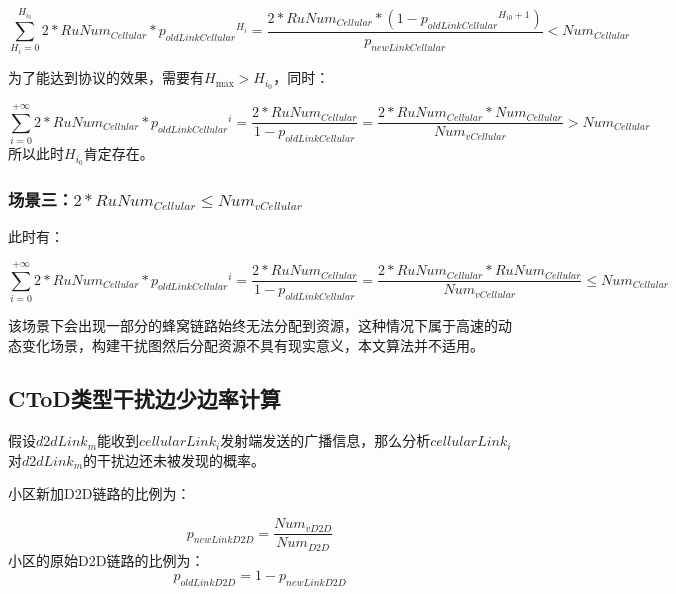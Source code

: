 \documentclass[figurelist,tablelist,algorithmlist,nomlist,masters]{seuthesix}
\begin{document}
	\begin{equation}\label{eq3.1}
	\sum\limits_{{H_i} = 0}^{{H_{{i_0}}}} {2*RuNu{m_{Cellular}}*{p_{oldLinkCellular}}^{{H_i}}}  = \frac{{2*RuNu{m_{Cellular}}*(1 - {p_{oldLinkCellular}}^{{H_{i0}} + 1})}}{{{p_{newLinkCellular}}}} < Nu{m_{Cellular}}
	\end{equation}
	
	为了能达到协议的效果，需要有${H_{\max }} > {H_{{i_0}}}$，同时：
	
	\begin{equation}\label{eq3.1}
	\sum\limits_{i = 0}^{ + \infty } {2*RuNu{m_{Cellular}}*{p_{oldLinkCellular}}^i}  = \frac{{2*RuNu{m_{Cellular}}}}{{1 - {p_{oldLinkCellular}}}} = \frac{{2*RuNu{m_{Cellular}}*Nu{m_{Cellular}}}}{{Nu{m_{vCellular}}}} > Nu{m_{Cellular}}
	\end{equation}
	所以此时${H_{{i_0}}}$肯定存在。
	
	\subsubsection{场景三：$2*RuNu{m_{Cellular}} \le Nu{m_{vCellular}}$}
	此时有：
	
	\begin{equation}\label{eq3.1}
	\sum\limits_{i = 0}^{ + \infty } {2*RuNu{m_{Cellular}}*{p_{oldLinkCellular}}^i}  = \frac{{2*RuNu{m_{Cellular}}}}{{1 - {p_{oldLinkCellular}}}} = \frac{{2*RuNu{m_{Cellular}}*RuNu{m_{Cellular}}}}{{Nu{m_{vCellular}}}} \le Nu{m_{Cellular}}
	\end{equation}
	
	该场景下会出现一部分的蜂窝链路始终无法分配到资源，这种情况下属于高速的动态变化场景，构建干扰图然后分配资源不具有现实意义，本文算法并不适用。
	
	
	\subsection{CToD类型干扰边少边率计算}
	假设$d2dLin{k_m}$能收到$cellularLin{k_i}$发射端发送的广播信息，那么分析$cellularLin{k_i}$对$d2dLin{k_m}$的干扰边还未被发现的概率。
	
	小区新加D2D链路的比例为：
	
	\begin{equation}\label{eq3.1}
	{p_{newLinkD2D}} = \frac{{Nu{m_{vD2D}}}}{{Nu{m_{D2D}}}}
	\end{equation}
	小区的原始D2D链路的比例为：
	\begin{equation}\label{eq3.1}
	{p_{oldLinkD2D}} = 1 - {p_{newLinkD2D}}
	\end{equation}
	
\end{document}

